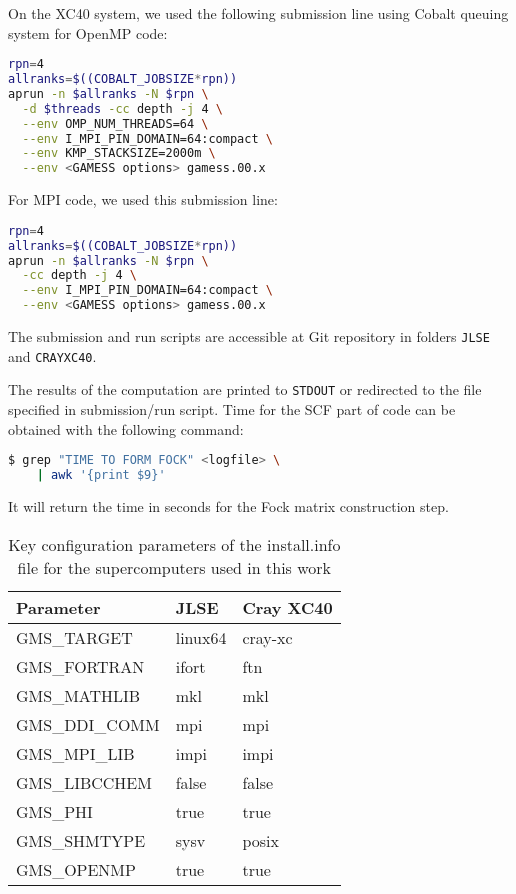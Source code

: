 On the XC40 system, we used the following submission line using Cobalt queuing system for OpenMP code:

\begin{lstlisting}[language=bash]
rpn=4
allranks=$((COBALT_JOBSIZE*rpn))
aprun -n $allranks -N $rpn \
  -d $threads -cc depth -j 4 \
  --env OMP_NUM_THREADS=64 \
  --env I_MPI_PIN_DOMAIN=64:compact \
  --env KMP_STACKSIZE=2000m \
  --env <GAMESS options> gamess.00.x
\end{lstlisting}

For MPI code, we used this submission line:
\begin{lstlisting}[language=bash]
rpn=4
allranks=$((COBALT_JOBSIZE*rpn))
aprun -n $allranks -N $rpn \
  -cc depth -j 4 \
  --env I_MPI_PIN_DOMAIN=64:compact \
  --env <GAMESS options> gamess.00.x
\end{lstlisting}

The submission and run scripts are accessible at Git repository in folders \texttt{JLSE} and \texttt{CRAYXC40}.

The results of the computation are printed to \texttt{STDOUT} or redirected to the file specified in submission/run script. Time for the SCF part of code can be obtained with the following command:
\begin{lstlisting}[language=bash]
$ grep "TIME TO FORM FOCK" <logfile> \
	| awk '{print $9}'
\end{lstlisting}
It will return the time in seconds for the Fock matrix construction step.

\begin{table}[ht]
	\centering
  	\caption{Key configuration parameters of the install.info file for the supercomputers used in this work}
  	\label{tab:ad:clust}
  	\begin{tabular}{lll}
    \toprule
    Parameter 			& JLSE		& Cray XC40 \\
    \midrule
    GMS\_TARGET			&	linux64	&	cray-xc	\\
    GMS\_FORTRAN		&	ifort	&	ftn		\\
	GMS\_MATHLIB		&	mkl		&	mkl 	\\
    GMS\_DDI\_COMM		&	mpi		&	mpi		\\
    GMS\_MPI\_LIB		&	impi	&	impi	\\
    GMS\_LIBCCHEM		&	false	&	false	\\
    GMS\_PHI			&	true	&	true	\\
    GMS\_SHMTYPE		&	sysv	&	posix	\\
    GMS\_OPENMP			&	true	&	true	\\
  	\bottomrule
\end{tabular}
\end{table}

